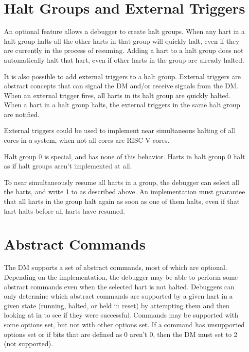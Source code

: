 \section{Halt Groups and External Triggers}

An optional feature allows a debugger to create halt groups. When any hart in a
halt group halts all the other harts in that group will quickly halt, even if
they are currently in the process of resuming. Adding a hart to a halt group
does not automatically halt that hart, even if other harts in the group are
already halted.

It is also possible to add external triggers to a halt group. External triggers
are abstract concepts that can signal the DM and/or receive signals from the
DM.  When an external trigger fires, all harts in its halt group are quickly
halted. When a hart in a halt group halts, the external triggers in the same
halt group are notified.

\begin{commentary}
    External triggers could be used to implement near simultaneous halting of
    all cores in a system, when not all cores are RISC-V cores.
\end{commentary}

Halt group 0 is special, and has none of this behavior. Harts in halt group 0
halt as if halt groups aren't implemented at all.

To near simultaneously resume all harts in a group, the debugger can select all
the harts, and write 1 to \FdmDmcontrolResumereq as described above. An implementation
must guarantee that all harts in the group halt again as soon as one of them
halts, even if that hart halts before all harts have resumed.

\section{Abstract Commands} \label{abstractcommands}

The DM supports a set of abstract commands, most of which
are optional. Depending on the implementation, the debugger may
be able to perform
some abstract commands even when the selected hart is not halted.
Debuggers can only determine which abstract commands
are supported by a given hart in a given state (running, halted, or held in reset) by attempting them
and then looking at \FdmAbstractcsCmderr in \RdmAbstractcs to see if they were successful.
Commands may be supported with some options set, but not with other options
set. If a command has unsupported options set or if bits that are defined as 0
aren't 0, then the DM must set \FdmAbstractcsCmderr to 2 (not supported).

